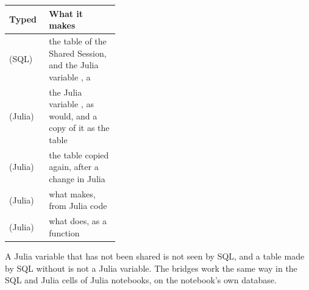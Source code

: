 \begin{center}\small
\renewcommand{\arraystretch}{1.25}
\begin{tabularx}{\linewidth}{@{}p{0.36\linewidth}L@{}}
\toprule
\textbf{Typed} & \textbf{What it makes}\\
\midrule
{} \hfill (SQL) & the table  of the Shared Session, and the Julia variable
  , a \\
 \hfill (Julia) & the Julia variable , as \file{=} would, and a copy of it as the
  table \\
 \hfill (Julia) & the table  copied again, after a change in Julia\\
 \hfill (Julia) & what  makes, from Julia code\\
 \hfill (Julia) & what  does, as a function\\
\bottomrule
\end{tabularx}
\end{center}
A Julia variable that has not been shared is not seen by SQL, and a table made by SQL without \file{:=} is not a Julia
variable. The bridges work the same way in the SQL and Julia cells of Julia notebooks, on the notebook's own database.


